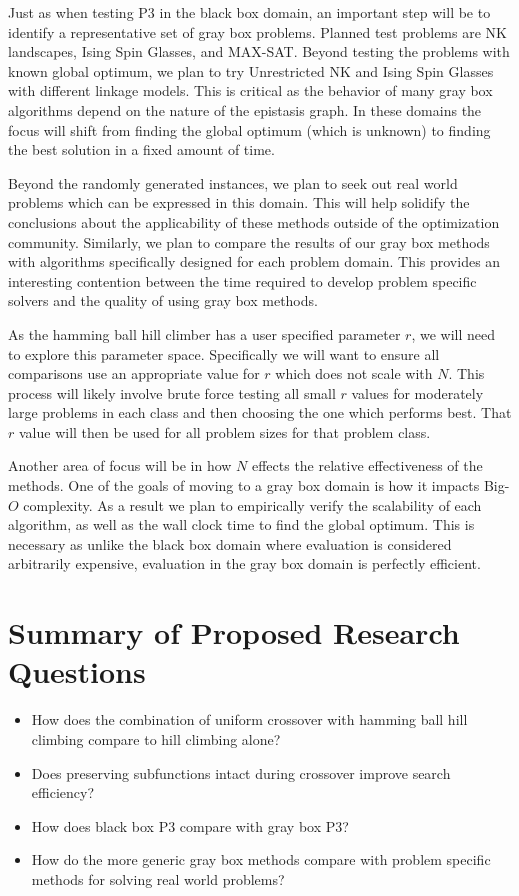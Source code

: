 Just as when testing P3 in the black box domain, an important step will be to identify a representative set
of gray box problems. Planned test problems are NK landscapes, Ising Spin Glasses, and MAX-SAT. Beyond testing the
problems with known global optimum, we plan to try Unrestricted NK and Ising Spin Glasses with different linkage models.
This is critical as the behavior of many gray box algorithms depend on the nature of the epistasis graph. In these domains
the focus will shift from finding the global optimum (which is unknown) to finding the best solution in a fixed amount of time.

Beyond the randomly generated instances, we plan to seek out real world problems which can be expressed in this domain.
This will help solidify the conclusions about the applicability of these methods outside of the optimization community.
Similarly, we plan to compare the results of our gray box methods with algorithms specifically designed for each problem
domain. This provides an interesting contention between the time required to develop problem specific solvers and the
quality of using gray box methods.

As the hamming ball hill climber has a user specified parameter $r$, we will need to explore this parameter space.
Specifically we will want to ensure all comparisons use an appropriate value for $r$ which does not scale with
$N$. This process will likely involve brute force testing all small $r$ values for moderately large problems in each class
and then choosing the one which performs best. That $r$ value will then be used for all problem sizes for that problem class.

Another area of focus will be in how $N$ effects the relative effectiveness of the methods. One of the goals of moving
to a gray box domain is how it impacts Big-$O$ complexity. As a result we plan to empirically verify the scalability
of each algorithm, as well as the wall clock time to find the global optimum. This is necessary as unlike the black box
domain where evaluation is considered arbitrarily expensive, evaluation in the gray box domain is perfectly efficient.

\section{Summary of Proposed Research Questions}
\begin{itemize}
\item How does the combination of uniform crossover with hamming ball hill climbing compare to hill climbing alone?
\item Does preserving subfunctions intact during crossover improve search efficiency?
\item How does black box P3 compare with gray box P3?
\item How do the more generic gray box methods compare with problem specific methods for solving real world problems?
\end{itemize}
